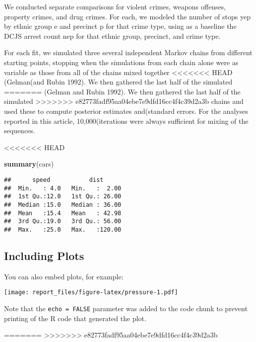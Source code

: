 \documentclass[]{article}
\newenvironment{Shaded}{\begin{snugshade}}{\end{snugshade}}
\newcommand{\KeywordTok}[1]{\textcolor[rgb]{0.13,0.29,0.53}{\textbf{#1}}}
\newcommand{\NormalTok}[1]{#1}
\begin{document}
We conducted separate comparisons for violent crimes, weapons offenses,
property crimes, and drug crimes. For each, we modeled the number of
stops yep by ethnic group e and precinct p for that crime type, using as
a baseline the DCJS arrest count nep for that ethnic group, precinct,
and crime type.

For each fit, we simulated three several independent Markov chains from
different starting points, stopping when the simulations from each chain
alone were as variable as those from all of the chains mixed together
<<<<<<< HEAD
(Gelman(and Rubin 1992). We then gathered the last half of the simulated
=======
(Gelman and Rubin 1992). We then gathered the last half of the simulated
>>>>>>> e82773fadf95aa04ebe7e9dfd16cc4f4c39d2a3b
chains and used these to compute posterior estimates and(standard
errors. For the analyses reported in this article, 10,000(iterations
were always sufficient for mixing of the sequences.

<<<<<<< HEAD
\begin{Shaded}
\begin{Highlighting}[]
\KeywordTok{summary}\NormalTok{(cars)}
\end{Highlighting}
\end{Shaded}

\begin{verbatim}
##      speed           dist       
##  Min.   : 4.0   Min.   :  2.00  
##  1st Qu.:12.0   1st Qu.: 26.00  
##  Median :15.0   Median : 36.00  
##  Mean   :15.4   Mean   : 42.98  
##  3rd Qu.:19.0   3rd Qu.: 56.00  
##  Max.   :25.0   Max.   :120.00
\end{verbatim}

\hypertarget{including-plots}{%
\subsection{Including Plots}\label{including-plots}}

You can also embed plots, for example:

\texttt{[image: report\_files/figure-latex/pressure-1.pdf]}

Note that the \texttt{echo\ =\ FALSE} parameter was added to the code
chunk to prevent printing of the R code that generated the plot.


=======
>>>>>>> e82773fadf95aa04ebe7e9dfd16cc4f4c39d2a3b
\end{document}

